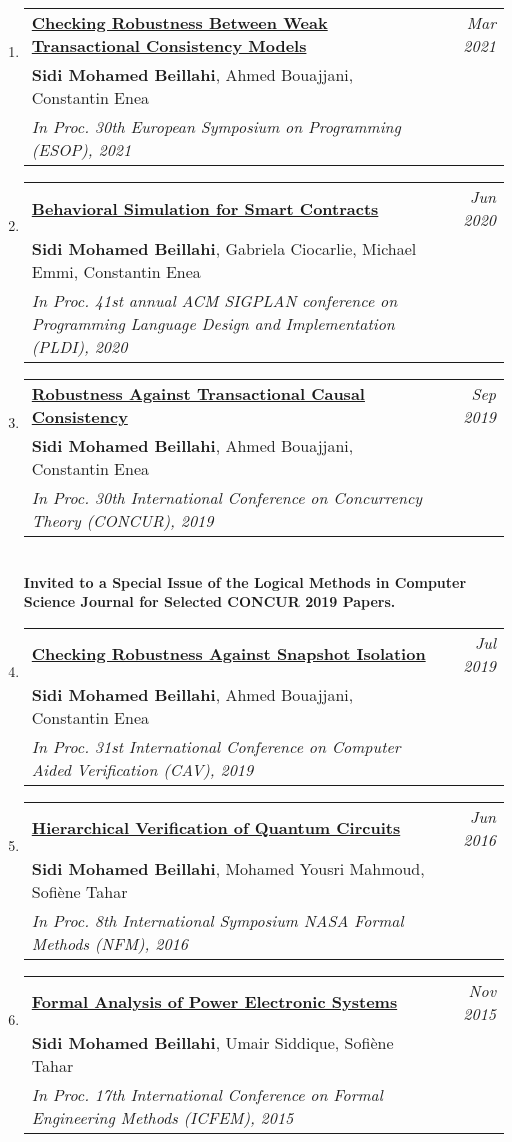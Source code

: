 \documentclass[10pt]{article}
\makeatletter
\newcommand{\lbar}[1]{{\color{#1}\ding{118}}\hspace*{2pt}}
\newenvironment{benumerate}[2]{
    \let\oldItem\item
    \def\item{\addtocounter{enumi}{-2}\oldItem}
    \begin{enumerate}[#2] \itemsep3pt
    \setcounter{enumi}{#1}
    \addtocounter{enumi}{1}}
  {\end{enumerate}}
\newenvironment{publication}[5]
{ \item
  \begin{tabular*}{7.5in}{p{6.3in}@{\extracolsep{\fill}}r}
    \href{#1}{\textbf{#2}} & \textit{#3}\\ #4 &\\ \textit{#5}&\\
  \end{tabular*}
} {}
\newenvironment{region}[3]{%
  \vspace*{0.5ex}
  {\scalebox{1.4}{\textbf{#1}}}
  \begin{benumerate}{#3}{\color{RoyalBlue}#2}}
  {\end{benumerate}\vspace{0.8ex}}
\makeatother
\begin{document}
\begin{region} {\lbar{black}Conference Publications}{{C}1}{17}
  \begin{publication} {https://beillahi.github.io/papers/ESOP21.pdf}
		{Checking Robustness Between Weak Transactional Consistency Models}
		{Mar 2021} {\textbf{Sidi Mohamed Beillahi}, Ahmed Bouajjani, Constantin Enea} 
		{In Proc. 30th European Symposium on Programming (ESOP), 2021} 
  \end{publication}

	\begin{publication} {https://beillahi.github.io/papers/PLDI20.pdf}
		{Behavioral Simulation for Smart Contracts}
		{Jun 2020} {\textbf{Sidi Mohamed Beillahi}, Gabriela Ciocarlie, Michael Emmi, Constantin Enea}
		{In Proc. 41st annual ACM SIGPLAN conference on Programming Language Design and Implementation (PLDI), 2020}
  \end{publication}

	\begin{publication} {https://beillahi.github.io/papers/CONCUR19.pdf}
		{Robustness Against Transactional Causal Consistency}
		{Sep 2019} {\textbf{Sidi Mohamed Beillahi}, Ahmed Bouajjani, Constantin Enea}
    {In Proc. 30th International Conference on Concurrency Theory (CONCUR), 2019}
    {\\ \textbf{Invited to a Special Issue of the Logical Methods in Computer Science Journal for Selected CONCUR 2019 Papers.}}
  \end{publication}

  \begin{publication} {https://beillahi.github.io/papers/CAV19.pdf}
    {Checking Robustness Against Snapshot Isolation}
    {Jul 2019} {\textbf{Sidi Mohamed Beillahi}, Ahmed Bouajjani, Constantin Enea}
    {In Proc. 31st International Conference on Computer Aided Verification (CAV), 2019}
  \end{publication}

  \begin{publication} {https://beillahi.github.io/papers/NFM16.pdf}
    {Hierarchical Verification of Quantum Circuits}
    {Jun 2016} {\textbf{Sidi Mohamed Beillahi}, Mohamed Yousri Mahmoud, Sofi\`{e}ne Tahar}
    {In Proc. 8th International Symposium NASA Formal Methods (NFM), 2016}
  \end{publication}

  \begin{publication} {https://beillahi.github.io/papers/ICFEM15.pdf}
    {Formal Analysis of Power Electronic Systems}
    {Nov 2015} {\textbf{Sidi Mohamed Beillahi}, Umair Siddique, Sofi\`{e}ne Tahar}
    {In Proc. 17th International Conference on Formal Engineering Methods (ICFEM), 2015}
  \end{publication}

\end{region}
\end{document}
